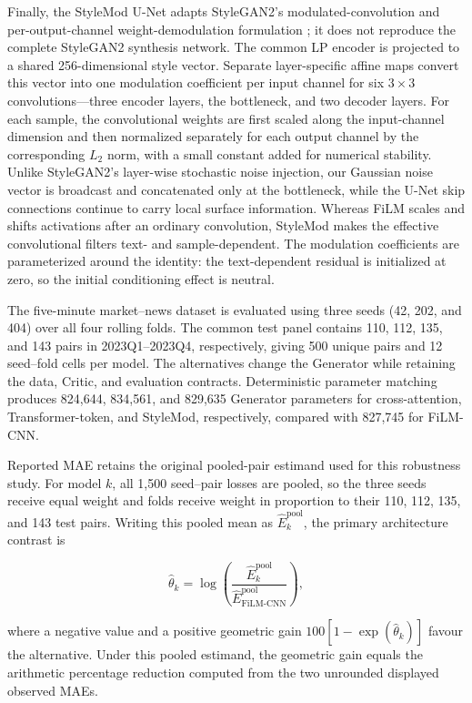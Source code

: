 Finally, the StyleMod U-Net adapts StyleGAN2's modulated-convolution and
per-output-channel weight-demodulation formulation
\citep[Section~2.2]{karras2020analyzing}; it does not reproduce the complete
StyleGAN2 synthesis network. The common LP encoder is projected to a shared
256-dimensional style vector. Separate layer-specific affine maps convert this
vector into one modulation coefficient per input channel for six $3\times3$
convolutions---three encoder layers, the bottleneck, and two decoder layers.
For each sample, the convolutional weights are first scaled along the
input-channel dimension and then normalized separately for each output channel
by the corresponding $L_2$ norm, with a small constant added for numerical
stability. Unlike StyleGAN2's layer-wise stochastic noise injection, our
Gaussian noise vector is broadcast and concatenated only at the bottleneck,
while the U-Net skip connections continue to carry local surface information.
Whereas FiLM scales and shifts activations after an ordinary convolution,
StyleMod makes the effective convolutional filters text- and sample-dependent.
The modulation coefficients are parameterized around the identity: the
text-dependent residual is initialized at zero, so the initial conditioning
effect is neutral.


The five-minute market--news dataset is evaluated using three seeds
(42, 202, and 404) over all four rolling folds. The common test panel contains
110, 112, 135, and 143 pairs in 2023Q1--2023Q4, respectively, giving 500
unique pairs and 12 seed--fold cells per model. The alternatives change the
Generator while retaining the data, Critic, and evaluation contracts.
Deterministic parameter matching produces 824,644, 834,561, and 829,635
Generator parameters for cross-attention, Transformer-token, and StyleMod,
respectively, compared with 827,745 for FiLM-CNN.

Reported MAE retains the original pooled-pair estimand used for this robustness
study.  For model $k$, all 1,500 seed--pair losses are pooled, so the three
seeds receive equal weight and folds receive weight in proportion to their
110, 112, 135, and 143 test pairs.  Writing this pooled mean as
$\widehat E^{\mathrm{pool}}_k$, the primary architecture contrast is

\[
\widehat{\theta}_{k}
=
\log\!\left(
\frac{\widehat E^{\mathrm{pool}}_k}
     {\widehat E^{\mathrm{pool}}_{\mathrm{FiLM\text{-}CNN}}}
\right),
\]

where a negative value and a positive geometric gain
$100[1-\exp(\widehat{\theta}_k)]$ favour the alternative.  Under this pooled
estimand, the geometric gain equals the arithmetic percentage reduction
computed from the two unrounded displayed observed MAEs.


